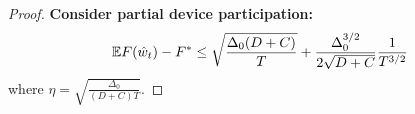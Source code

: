 \begin{proof}
\textbf{Consider partial device participation:}
\begin{align*}
	 \mathbb{E} F(\hat{w}_t) - F^* & \leq \sqrt{\frac{\Delta_0(D + C)}{T}} + \frac{\Delta_0^{3/2}}{2\sqrt{D+C}}\frac{1}{T^{3/2}} \nonumber\\
\end{align*}
where $\eta = \sqrt{\frac{\Delta_0}{(D+C)T}}$. 
\end{proof}

